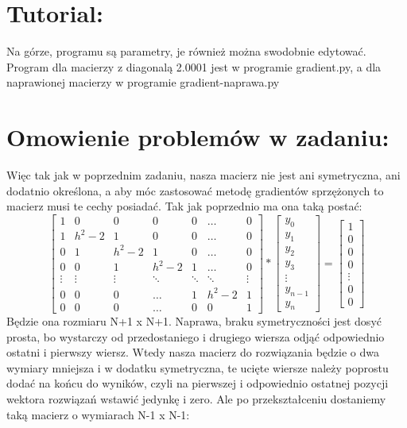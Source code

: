 \documentclass[12pt]{article}
\begin{document}
\section{Tutorial:}
Na górze, programu są parametry, je również można swodobnie edytować. Program dla macierzy z diagonalą 2.0001 jest w programie gradient.py, a dla naprawionej macierzy w programie gradient-naprawa.py
\section{Omowienie problemów w zadaniu:}
Więc tak jak w poprzednim zadaniu, nasza macierz nie jest ani symetryczna, ani dodatnio określona, a aby móc zastosować metodę gradientów sprzężonych to macierz musi te cechy posiadać. Tak jak poprzednio ma ona taką postać:
\[
\begin{bmatrix}
    1 & 0 & 0 & 0 & 0 & \dots & 0\\
    1 & h^{2}-2 & 1 & 0 & 0 & \dots & 0\\ 
    0 & 1 & h^{2}-2 & 1 & 0 & \dots & 0\\
    0 & 0 & 1 & h^{2}-2 & 1 &\dots & 0\\
    \vdots & \vdots & \vdots & \ddots & \ddots & \ddots & \vdots\\
    0 & 0 & 0 & \hdots & 1 & h^{2}-2 & 1\\
    0 & 0 & 0 & \hdots & 0 & 0 & 1
\end{bmatrix}
*
\begin{bmatrix}
    y_{0}\\
    y_{1}\\
    y_{2}\\
    y_{3}\\
    \vdots\\
    y_{n-1}\\
    y_{n}
\end{bmatrix}
=
\begin{bmatrix}
    1\\
    0\\
    0\\
    0\\
    \vdots\\
    0\\
    0
\end{bmatrix}
\]
Będzie ona rozmiaru N+1 x N+1. Naprawa, braku symetryczności jest dosyć prosta, bo wystarczy od przedostaniego i drugiego wiersza odjąć odpowiednio ostatni i pierwszy wiersz. Wtedy nasza macierz do rozwiązania będzie o dwa wymiary mniejsza i w dodatku symetryczna, te ucięte wiersze należy poprostu dodać na końcu do wyników, czyli na pierwszej i odpowiednio ostatnej pozycji wektora rozwiązań wstawić jedynkę i zero. Ale po przekształceniu dostaniemy taką macierz o wymiarach N-1 x N-1:
\end{document}
